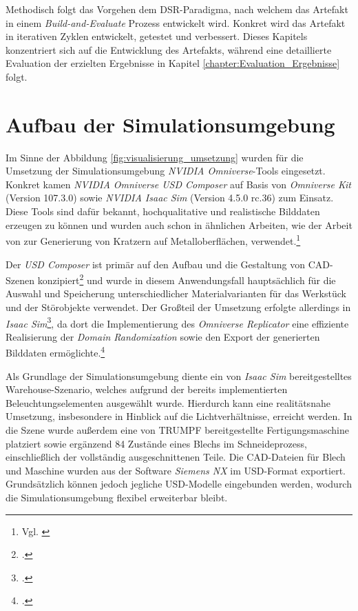 Methodisch folgt das Vorgehen dem \ac{DSR}-Paradigma, nach welchem das Artefakt in einem \textit{Build-and-Evaluate} Prozess entwickelt wird. Konkret wird das Artefakt in iterativen Zyklen entwickelt, getestet und verbessert. Dieses Kapitels konzentriert sich auf die Entwicklung des Artefakts, während eine detaillierte Evaluation der erzielten Ergebnisse in Kapitel \ref{chapter:Evaluation_Ergebnisse} folgt.


\section{Aufbau der Simulationsumgebung}

Im Sinne der Abbildung \ref{fig:visualisierung_umsetzung} wurden für die Umsetzung der Simulationsumgebung \textit{NVIDIA Omniverse}-Tools eingesetzt. Konkret kamen \textit{NVIDIA Omniverse USD Composer} auf Basis von \textit{Omniverse Kit} (Version 107.3.0) sowie \textit{NVIDIA Isaac Sim} (Version 4.5.0 rc.36) zum Einsatz. Diese Tools sind dafür bekannt, hochqualitative und realistische Bilddaten erzeugen zu können und wurden auch schon in ähnlichen Arbeiten, wie der Arbeit von \cite{monnet_investigating_2024} zur Generierung von Kratzern auf Metalloberflächen, verwendet.\footnote{Vgl. \cite[769 ff.]{monnet_investigating_2024}}

Der \textit{USD Composer} ist primär auf den Aufbau und die Gestaltung von \ac{CAD}-Szenen konzipiert\footcite{nvidia_omniverse_2025} und wurde in diesem Anwendungsfall hauptsächlich für die Auswahl und Speicherung unterschiedlicher Materialvarianten für das Werkstück und der Störobjekte verwendet. Der Großteil der Umsetzung erfolgte allerdings in \textit{Isaac Sim}\footcite{nvidia_isaac_2025}, da dort die Implementierung des \textit{Omniverse Replicator} eine effiziente Realisierung der \textit{Domain Randomization} sowie den Export der generierten Bilddaten ermöglichte.\footcite{nvidia_replicator_2025}

Als Grundlage der Simulationsumgebung diente ein von \textit{Isaac Sim} bereitgestelltes Warehouse-Szenario, welches aufgrund der bereits implementierten Beleuchtungselementen ausgewählt wurde. Hierdurch kann eine realitätsnahe Umsetzung, insbesondere in Hinblick auf die Lichtverhältnisse, erreicht werden. In die Szene wurde außerdem eine von TRUMPF bereitgestellte Fertigungsmaschine platziert sowie ergänzend 84 Zustände eines Blechs im Schneideprozess, einschließlich der vollständig ausgeschnittenen Teile. Die CAD-Dateien für Blech und Maschine wurden aus der Software \textit{Siemens NX} im USD-Format exportiert. Grundsätzlich können jedoch jegliche USD-Modelle eingebunden werden, wodurch die Simulationsumgebung flexibel erweiterbar bleibt. 

